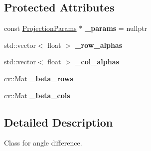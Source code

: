 \subsection*{Protected Attributes}
\begin{DoxyCompactItemize}
\item 
\hypertarget{classdepth__clustering_1_1AngleDiffPrecomputed_ac37e01df194d9063b7e7bd1f7b7aa6a4}{const \hyperlink{classdepth__clustering_1_1ProjectionParams}{Projection\-Params} $\ast$ {\bfseries \-\_\-params} = nullptr}\label{classdepth__clustering_1_1AngleDiffPrecomputed_ac37e01df194d9063b7e7bd1f7b7aa6a4}

\item 
\hypertarget{classdepth__clustering_1_1AngleDiffPrecomputed_a2ba86b3ed5f12c2a7e2e8beef81bd88d}{std\-::vector$<$ float $>$ {\bfseries \-\_\-row\-\_\-alphas}}\label{classdepth__clustering_1_1AngleDiffPrecomputed_a2ba86b3ed5f12c2a7e2e8beef81bd88d}

\item 
\hypertarget{classdepth__clustering_1_1AngleDiffPrecomputed_a90f6e3fd2f4b585c2cd03809f3818ee9}{std\-::vector$<$ float $>$ {\bfseries \-\_\-col\-\_\-alphas}}\label{classdepth__clustering_1_1AngleDiffPrecomputed_a90f6e3fd2f4b585c2cd03809f3818ee9}

\item 
\hypertarget{classdepth__clustering_1_1AngleDiffPrecomputed_a2df8751352e4621cb69743801e151b75}{cv\-::\-Mat {\bfseries \-\_\-beta\-\_\-rows}}\label{classdepth__clustering_1_1AngleDiffPrecomputed_a2df8751352e4621cb69743801e151b75}

\item 
\hypertarget{classdepth__clustering_1_1AngleDiffPrecomputed_ae7faa81ea82d0ff9f75f8a1e63659ced}{cv\-::\-Mat {\bfseries \-\_\-beta\-\_\-cols}}\label{classdepth__clustering_1_1AngleDiffPrecomputed_ae7faa81ea82d0ff9f75f8a1e63659ced}

\end{DoxyCompactItemize}


\subsection{Detailed Description}
Class for angle difference. 

